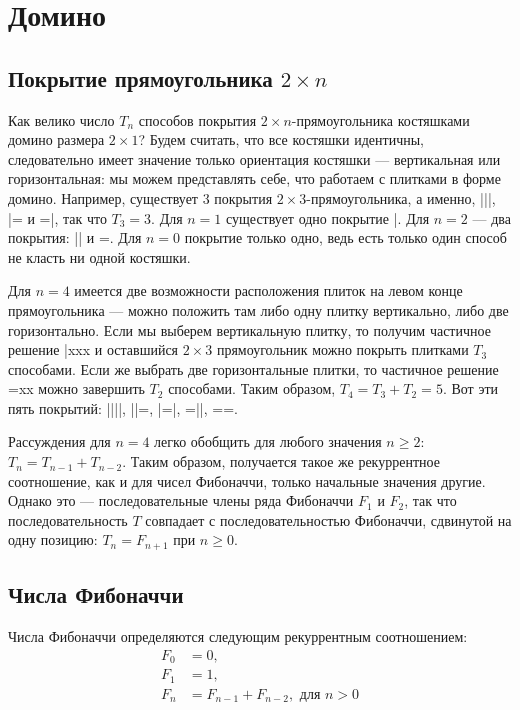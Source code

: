 \section{Домино}

\subsection{Покрытие прямоугольника $2\times n$}

Как велико число $T_n$ способов покрытия $2\times n$-прямоугольника костяшками домино размера
$2\times 1$? Будем считать, что все костяшки идентичны, следовательно имеет значение только
ориентация костяшки --- вертикальная или горизонтальная: мы можем представлять себе, что
работаем с плитками в форме домино. Например, существует $3$ покрытия $2\times 3$-прямоугольника,
а именно, |||, |= и =|, так что $T_3 = 3$. Для $n=1$ существует одно покрытие |. Для $n=2$
--- два покрытия: || и =. Для $n=0$ покрытие только одно, ведь есть только один
способ не класть ни одной костяшки.

Для $n=4$ имеется две возможности расположения плиток на левом конце прямоугольника
--- можно положить там либо одну плитку вертикально, либо две горизонтально. Если мы выберем
вертикальную плитку, то получим частичное решение |xxx и оставшийся $2\times 3$ прямоугольник
можно покрыть плитками $T_3$ способами. Если же выбрать две горизонтальные плитки, то
частичное решение =xx можно завершить $T_2$ способами. Таким образом, $T_4=T_3+T_2=5$.
Вот эти пять покрытий: ||||, ||=, |=|, =||, ==.

Рассуждения для $n=4$ легко обобщить для любого значения $n \ge 2$: $T_n = T_{n-1} + T_{n-2}$.
Таким образом, получается такое же рекуррентное соотношение, как и для чисел Фибоначчи,
только начальные значения другие. Однако это --- последовательные члены ряда Фибоначчи
$F_1$ и $F_2$, так что последовательность $T$ совпадает с последовательностью Фибоначчи,
сдвинутой на одну позицию: $T_n = F_{n+1} \text{ при $n \ge 0$}$.

\subsection{Числа Фибоначчи}

Числа Фибоначчи определяются следующим рекуррентным соотношением:
\begin{align*}
F_0 &= 0, \\
F_1 &= 1, \\
F_n &= F_{n-1} + F_{n-2}, \text{ для $n>0$}
\end{align*}

